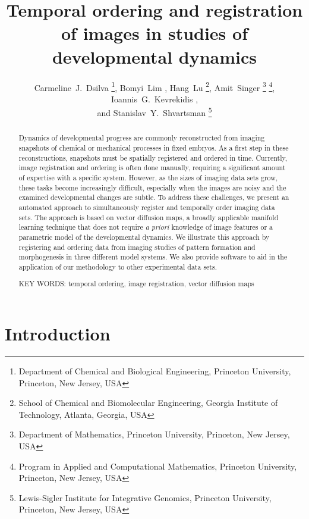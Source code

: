 \documentclass[twocolumn, 10pt]{article}
\title{Temporal ordering and registration of images in studies of developmental dynamics}
\author{Carmeline~J.~Dsilva \thanks{Department of Chemical and Biological Engineering, Princeton University, Princeton, New Jersey, USA},
Bomyi~Lim \footnotemark[1],
Hang~Lu \thanks{School of Chemical and Biomolecular Engineering, Georgia Institute of Technology, Atlanta, Georgia, USA},
Amit~Singer \thanks{Department of Mathematics, Princeton University, Princeton, New Jersey, USA} \thanks{Program in Applied and Computational Mathematics, Princeton University, Princeton, New Jersey, USA}, Ioannis~G.~Kevrekidis \footnotemark[1] \footnotemark[4] ,\\ and
Stanislav~Y.~Shvartsman \footnotemark[1] \thanks{Lewis-Sigler Institute for Integrative Genomics, Princeton University, Princeton, New Jersey, USA}}
\date{}
\begin{document}
\maketitle

\begin{abstract}

Dynamics of developmental progress are commonly reconstructed from imaging snapshots of chemical or mechanical processes in fixed embryos.
%
As a first step in these reconstructions, snapshots must be spatially registered and ordered in time.
%
Currently, image registration and ordering is often done manually, requiring a significant amount of expertise with a specific system.
%
However, as the sizes of imaging data sets grow, these tasks become increasingly difficult, especially when the images are noisy and the examined developmental changes are subtle.
%
To address these challenges, we present an automated approach to simultaneously register and temporally order imaging data sets.
%
The approach is based on vector diffusion maps, a broadly applicable manifold learning technique that does not require \textit{a priori} knowledge of image features or a parametric model of the developmental dynamics.
%
We illustrate this approach by registering and ordering data from imaging studies of pattern formation and morphogenesis in three different model systems.
%
We also provide software to aid in the application of our methodology to other experimental data sets.
\vspace{1em}

\noindent
KEY WORDS: temporal ordering, image registration, vector diffusion maps

\end{abstract}



\section*{Introduction}
\end{document}
